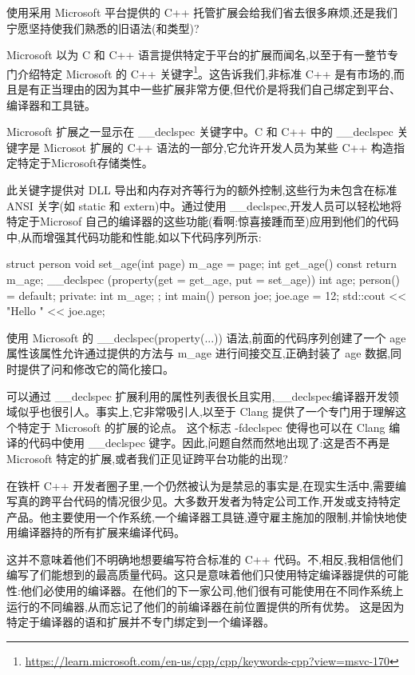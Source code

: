 使用采用 Microsoft 平台提供的 C++ 托管扩展会给我们省去很多麻烦,还是我们宁愿坚持使我们熟悉的旧语法(和类型)? 

Microsoft 以为 C 和 C++ 语言提供特定于平台的扩展而闻名,以至于有一整节专门介绍特定 Microsoft 的 C++ 关键字\footnote{\url{https://learn.microsoft.com/en-us/cpp/cpp/keywords-cpp?view=msvc-170}}。这告诉我们,非标准 C++ 是有市场的,而且是有正当理由的因为其中一些扩展非常方便,但代价是将我们自己绑定到平台、编译器和工具链。

Microsoft 扩展之一显示在 \_\_declspec 关键字中。C 和 C++ 中的 \_\_declspec 关键字是 Microsot 扩展的 C++ 语法的一部分,它允许开发人员为某些 C++ 构造指定特定于Microsoft存储类性。

此关键字提供对 DLL 导出和内存对齐等行为的额外控制,这些行为未包含在标准 ANSI 关字(如 static 和 extern)中。通过使用 \_\_declspec,开发人员可以轻松地将特定于Microsof 自己的编译器的这些功能(看啊:惊喜接踵而至)应用到他们的代码中,从而增强其代码功能和性能,如以下代码序列所示:

\begin{cpp}
struct person {
  void set_age(int page) { m_age = page; }
  int get_age() const { return m_age; }
  __declspec (property(get = get_age, put = set_age)) int age;
  person() = default;
private:
  int m_age;
};
int main() {
  person joe;
  joe.age = 12;
  std::cout << "Hello " << joe.age;
}
\end{cpp}

使用 Microsoft 的 \_\_declspec(property(...)) 语法,前面的代码序列创建了一个 age 属性该属性允许通过提供的方法与 m\_age 进行间接交互,正确封装了 age 数据,同时提供了问和修改它的简化接口。

可以通过 \_\_declspec 扩展利用的属性列表很长且实用,\_\_declspec编译器开发领域似乎也很引人。事实上,它非常吸引人,以至于 Clang 提供了一个专门用于理解这个特定于 Microsoft 的扩展的论点。 这个标志 -fdeclspec 使得也可以在 Clang 编译的代码中使用 \_\_declspec 键字。因此,问题自然而然地出现了:这是否不再是 Microsoft 特定的扩展,或者我们正见证跨平台功能的出现?

在铁杆 C++ 开发者圈子里,一个仍然被认为是禁忌的事实是,在现实生活中,需要编写真的跨平台代码的情况很少见。大多数开发者为特定公司工作,开发或支持特定产品。他主要使用一个作系统,一个编译器工具链,遵守雇主施加的限制,并愉快地使用编译器持的所有扩展来编译代码。

这并不意味着他们不明确地想要编写符合标准的 C++ 代码。不,相反,我相信他们编写了们能想到的最高质量代码。这只是意味着他们只使用特定编译器提供的可能性:他们必使用的编译器。在他们的下一家公司,他们很有可能使用在不同作系统上运行的不同编器,从而忘记了他们的前编译器在前位置提供的所有优势。 这是因为特定于编译器的语和扩展并不专门绑定到一个编译器。

